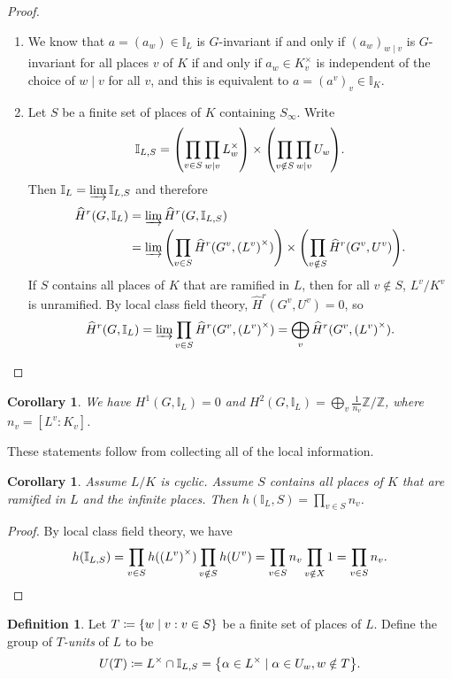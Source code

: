 \documentclass[leqno, openany]{memoir}
\newtheorem{cor}[thm]{Corollary}
\theoremstyle{definition}
\newtheorem{defn}[thm]{Definition}
\theoremstyle{remark}
\theoremstyle{plain}
\theoremstyle{definition}
\theoremstyle{remark}
\newcommand{\Z}{\mathbb{Z}}
\newcommand{\I}{\mathbb{I}}
\newcommand{\wh}[1]{\widehat{#1}}
\begin{document}
\begin{proof}\leavevmode \begin{enumerate} \item We know that $a = {(a_w)} \in
    \I_L$ is $G$-invariant if and only if ${(a_w)}_{w \mid v}$ is $G$-invariant
    for all places $v$ of $K$ if and only if $a_w \in K_v^{\times}$ is
    independent of the choice of $w \mid v$ for all $v$, and this is equivalent
    to $a = {(a^v)}_v \in \I_K$.  \item Let $S$ be a finite set of places of
    $K$ containing $S_{\infty}$. Write \[ \I_{L, S} = \qty(\prod_{v \in S}
    \prod_{w \mid v} L_w^{\times}) \times \qty(\prod_{v \notin S} \prod_{w \mid
v} U_w). \] Then $\I_L = \varinjlim \I_{L, S}$ and therefore \begin{align*}
\wh{H}^r(G, \I_L) &= \varinjlim \wh{H}^r(G, \I_{L, S}) \\ &= \varinjlim
\qty(\prod_{v \in S} \wh{H}^r(G^v, {(L^v)}^{\times})) \times \qty(\prod_{v
\notin S} \wh{H}^r(G^v, U^v)).  \end{align*} If $S$ contains all places of $K$
that are ramified in $L$, then for all $v \notin S$, $L^v/K^v$ is unramified.
By local class field theory, $\wh{H}^r(G^v, U^v) = 0$, so \[ \wh{H}^r(G, \I_L)
= \varinjlim \prod_{v \in S} \wh{H}^r(G^v, {(L^v)}^{\times}) = \bigoplus_v
\wh{H}^r(G^v, {(L^v)}^{\times}). \qedhere \] \end{enumerate} \end{proof}

\begin{cor} We have $H^1(G, \I_L) = 0$ and $H^2(G, \I_L) = \bigoplus_v
\frac{1}{n_v} \Z/\Z$, where $n_v = [L^v: K_v]$.  \end{cor}

These statements follow from collecting all of the local information.

\begin{cor} Assume $L/K$ is cyclic. Assume $S$ contains all places of $K$ that
are ramified in $L$ and the infinite places. Then $h(\I_L, S) = \prod_{v \in S}
n_v$.  \end{cor}

\begin{proof} By local class field theory, we have \[ h(\I_{L, S}) = \prod_{v
\in S} h({(L^v)}^{\times}) \prod_{v \notin S} h(U^v) = \prod_{v \in S} n_v
\prod_{v \notin X} 1 = \prod_{v \in S} n_v. \qedhere \] \end{proof}

\begin{defn} Let $T \coloneqq \qty{w \mid v : v \in S}$ be a finite set of
    places of $L$. Define the group of \textit{$T$-units} of $L$ to be \[ U(T)
    \coloneqq L^{\times} \cap \I_{L, S} = \qty{\alpha \in L^{\times} \mid
\alpha \in U_w, w \notin T}. \] \end{defn}
\end{document}

